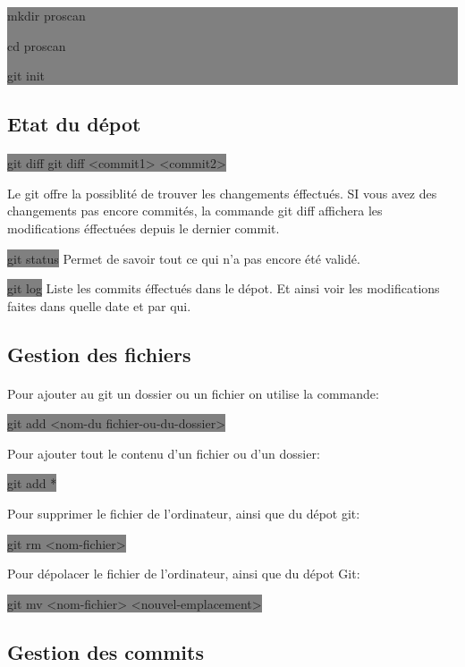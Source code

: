 \documentclass[11pt,a4paper,titlepage, oneside]{article}
\begin{document}
			\colorbox{gray}{mkdir proscan

				cd proscan
	
				git init}
	
	\subsection{{\color{red} Etat du dépot}}	
		\paragraph{}
			\colorbox{gray}{git diff git diff <commit1> <commit2>}

			Le git offre la possiblité de trouver les changements éffectués. SI vous avez des changements pas encore commités, la commande git diff affichera les modifications éffectuées depuis le dernier commit.

			\colorbox{gray}{git status} Permet de savoir tout ce qui n'a pas encore été validé.
	
			\colorbox{gray}{git log} Liste les commits éffectués dans le dépot. Et ainsi voir les modifications faites dans quelle date et par qui.

	\subsection{{\color{red} Gestion des fichiers}}

		\paragraph{}
			Pour ajouter au git un dossier ou un fichier on utilise la commande:

			\colorbox{gray}{git add <nom-du fichier-ou-du-dossier>}

			Pour ajouter tout le contenu d'un fichier ou d'un dossier:

			\colorbox{gray}{git add *}

			Pour supprimer le fichier de l'ordinateur, ainsi que du dépot git:		
			
			\colorbox{gray}{git rm <nom-fichier>}

			Pour dépolacer le fichier de l'ordinateur, ainsi que du dépot Git:
			
			\colorbox{gray}{git mv <nom-fichier> <nouvel-emplacement>}

	\subsection{{\color{red} Gestion des commits}}
\end{document}
